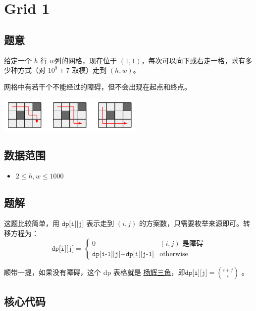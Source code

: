 \section{Grid 1}
\subsection*{题意}
给定一个 $h$ 行 $w$列的网格，现在位于 $(1,1)$，每次可以向下或右走一格，求有多少种方式（对 $10^9 + 7$ 取模）走到 $(h,w)$。

网格中有若干个不能经过的障碍，但不会出现在起点和终点。
\begin{center}
\includegraphics[width=7cm]{Pics/grid.png}
\end{center}
\subsection*{数据范围}
\begin{itemize}
\item $2 \leq h,w \leq 1000$
\end{itemize}
\subsection*{题解}

这题比较简单，用 ${\texttt{dp[i][j]}}$ 表示走到 $(i,j)$ 的方案数，只需要枚举来源即可。转移方程为：
\begin{equation*}
{\texttt{dp[i][j]}} = 
\begin{cases}
 0 & (i,j)\text{ 是障碍}\\
 {\texttt{dp[i-1][j]}} + {\texttt{dp[i][j-1]}} & \text{otherwise}
\end{cases}
\end{equation*}


顺带一提，如果没有障碍，这个 dp 表格就是 \href{https://zh.wikipedia.org/zh-hans/%E6%9D%A8%E8%BE%89%E4%B8%89%E8%A7%92%E5%BD%A2}{杨辉三角}，即${\texttt{dp[i][j]}} = {\binom{i+j}{i}}$ 。



\subsection*{核心代码}
\inputminted[linenos,autogobble]{cpp}{../Code/H.cpp}
\newpage